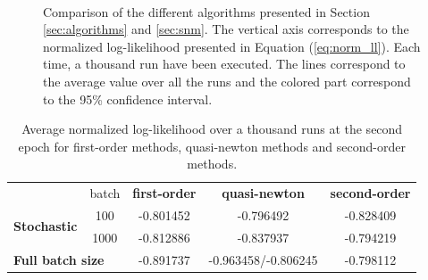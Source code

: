 \documentclass[conference]{IEEEtran}
\begin{document}
\begin{figure}[t]
    \centering
    ~
    ~
    \caption{Comparison of the different algorithms presented in Section \ref{sec:algorithms} and \ref{sec:snm}. The vertical axis corresponds to the normalized log-likelihood presented in Equation (\ref{eq:norm_ll}). Each time, a thousand run have been executed. The lines correspond to the average value over all the runs and the colored part correspond to the 95\% confidence interval.}
    \label{fig:comparison_algo}
    \vspace{-0.5cm}
\end{figure}

\begin{table}
\centering
\renewcommand\arraystretch{1.2}
\begin{tabular}{lc|ccc}
&\multicolumn{1}{c}{batch} & {\bf first-order} & {\bf quasi-newton} & {\bf second-order} \\ \cline{3-5}
\multirow{ 2}{*}{\bf Stochastic} & 100 & -0.801452 & -0.796492 & -0.828409 \\
& 1000 & -0.812886 & -0.837937 & -0.794219 \\
\multicolumn{2}{l|}{\bf Full batch size}  & -0.891737 & -0.963458/-0.806245 & -0.798112
\end{tabular}
\caption{\label{tab:comparison_algo} Average normalized log-likelihood over a thousand runs at the second epoch for first-order methods, quasi-newton methods and second-order methods.}
\vspace{-0.5cm}
\end{table}
\end{document}
